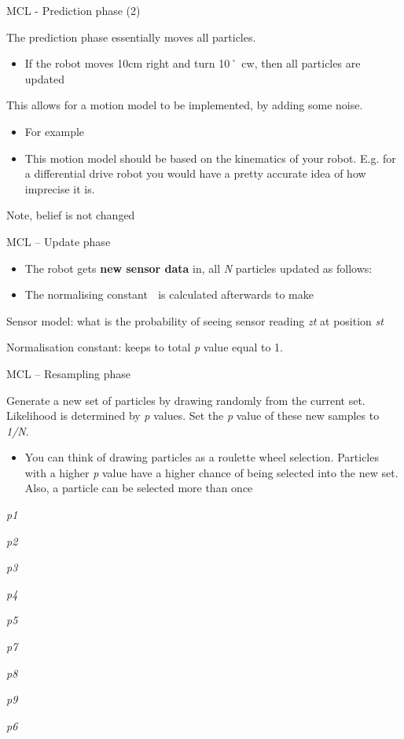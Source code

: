\documentclass[compress]{beamer}
\begin{document}
\begin{frame}{MCL - Prediction phase (2)}

The prediction phase essentially moves all particles.

\begin{itemize}
\item If the robot moves 10cm right and turn 10˚ cw, then all particles are
  updated
\end{itemize}

This allows for a motion model to be implemented, by adding some noise.

\begin{itemize}
\item For example
\item This motion model should be based on the kinematics of your robot.
  E.g. for a differential drive robot you would have a pretty accurate
  idea of how imprecise it is.
\end{itemize}

Note, belief is not changed

\end{frame}

\begin{frame}{MCL -- Update phase}

\begin{itemize}
\item The robot gets \textbf{new sensor data} in, all \emph{N} particles
  updated as follows:
\item The normalising constant \emph{} is calculated afterwards to make
\end{itemize}

Sensor model: what is the probability of seeing sensor reading \emph{zt}
at position \emph{st}

Normalisation constant: keeps to total \emph{p} value equal to 1.

\end{frame}

\begin{frame}{MCL -- Resampling phase}

Generate a new set of particles by drawing randomly from the current
set. Likelihood is determined by \emph{p} values. Set the \emph{p} value
of these new samples to \emph{1/N}.

\begin{itemize}
\item You can think of drawing particles as a roulette wheel selection.
  Particles with a higher \emph{p} value have a higher chance of being
  selected into the new set. Also, a particle can be selected more than
  once
\end{itemize}

\emph{p1}

\emph{p2}

\emph{p3}

\emph{p4}

\emph{p5}

\emph{p7}

\emph{p8}

\emph{p9}

\emph{p6}

\end{frame}
\end{document}
